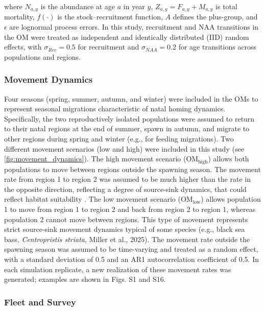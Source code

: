 \documentclass[
  12pt,
]{article}
\begin{document}
where \(N_{a,y}\) is the abundance at age \(a\) in year \(y\),
\(Z_{a,y} = F_{a,y} + M_{a,y}\) is total mortality, \(f(\cdot)\) is the
stock--recruitment function, \(A\) defines the plus-group, and
\(\epsilon\) are lognormal process errors. In this study, recruitment
and NAA transitions in the OM were treated as independent and
identically distributed (IID) random effects, with
\(\sigma_{Rec} = 0.5\) for recruitment and \(\sigma_{NAA} = 0.2\) for
age transitions across populations and regions.

\hypertarget{movement-dynamics}{%
\subsubsection{Movement Dynamics}\label{movement-dynamics}}

Four seasons (spring, summer, autumn, and winter) were included in the
OMs to represent seasonal migrations characteristic of natal homing
dynamics. Specifically, the two reproductively isolated populations were
assumed to return to their natal regions at the end of summer, spawn in
autumn, and migrate to other regions during spring and winter (e.g., for
feeding migrations). Two different movement scenarios (low and high)
were included in this study (see \autoref{fig:movement_dynamics}). The
high movement scenario (\(\text{OM}_{\text{high}}\)) allows both
populations to move between regions outside the spawning season. The
movement rate from region 1 to region 2 was assumed to be much higher
than the rate in the opposite direction, reflecting a degree of
source-sink dynamics, that could reflect habitat suitability
\citep{Keymer2000}. The low movement scenario
(\(\text{OM}_{\text{low}}\)) allows population 1 to move from region 1
to region 2 and back from region 2 to region 1, whereas population 2
cannot move between regions. This type of movement represents strict
source-sink movement dynamics typical of some species (e.g., black sea
bass, \emph{Centropristis striata}, Miller et al., 2025). The movement
rate outside the spawning season was assumed to be time-varying and
treated as a random effect, with a standard deviation of 0.5 and an AR1
autocorrelation coefficient of 0.5. In each simulation replicate, a new
realization of these movement rates was generated; examples are shown in
Figs. S1 and S16.

\hypertarget{fleet-and-survey}{%
\subsubsection{Fleet and Survey}\label{fleet-and-survey}}
\end{document}
